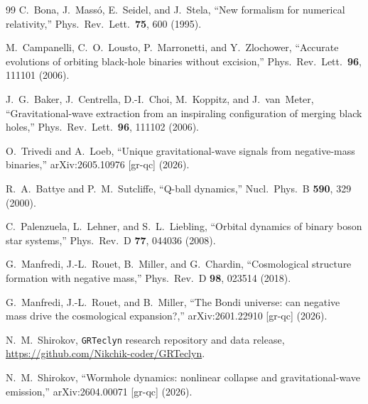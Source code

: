 \documentclass[twocolumn,floatfix,aps,prd,superscriptaddress,nofootinbib]{revtex4-2}
\begin{document}
\begin{thebibliography}{99}
C.~Bona, J.~Mass\'o, E.~Seidel, and J.~Stela,
\newblock ``New formalism for numerical relativity,''
\newblock Phys.\ Rev.\ Lett.\ \textbf{75}, 600 (1995).

M.~Campanelli, C.~O.~Lousto, P.~Marronetti, and Y.~Zlochower,
\newblock ``Accurate evolutions of orbiting black-hole binaries without excision,''
\newblock Phys.\ Rev.\ Lett.\ \textbf{96}, 111101 (2006).

J.~G.~Baker, J.~Centrella, D.-I.~Choi, M.~Koppitz, and J.~van~Meter,
\newblock ``Gravitational-wave extraction from an inspiraling configuration of merging black holes,''
\newblock Phys.\ Rev.\ Lett.\ \textbf{96}, 111102 (2006).

O.~Trivedi and A.~Loeb,
\newblock ``Unique gravitational-wave signals from negative-mass binaries,''
\newblock arXiv:2605.10976 [gr-qc] (2026).

R.~A.~Battye and P.~M.~Sutcliffe,
\newblock ``Q-ball dynamics,''
\newblock Nucl.\ Phys.\ B \textbf{590}, 329 (2000).

C.~Palenzuela, L.~Lehner, and S.~L.~Liebling,
\newblock ``Orbital dynamics of binary boson star systems,''
\newblock Phys.\ Rev.\ D \textbf{77}, 044036 (2008).

G.~Manfredi, J.-L.~Rouet, B.~Miller, and G.~Chardin,
\newblock ``Cosmological structure formation with negative mass,''
\newblock Phys.\ Rev.\ D \textbf{98}, 023514 (2018).

G.~Manfredi, J.-L.~Rouet, and B.~Miller,
\newblock ``The Bondi universe: can negative mass drive the cosmological expansion?,''
\newblock arXiv:2601.22910 [gr-qc] (2026).

N.~M.~Shirokov,
\newblock \texttt{GRTeclyn} research repository and data release,
\newblock \url{https://github.com/Nikchik-coder/GRTeclyn}.

N.~M.~Shirokov,
\newblock ``Wormhole dynamics: nonlinear collapse and gravitational-wave emission,''
\newblock arXiv:2604.00071 [gr-qc] (2026).

\end{thebibliography}
\end{document}
